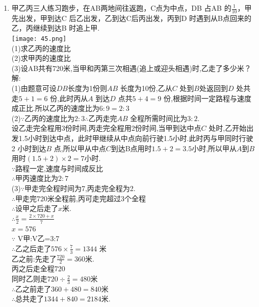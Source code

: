 \documentclass[12pt,oneside,a4paper]{ctexbook} %
\numberwithin{chapter}{part}
\begin{document}
\begin{enumerate}
\item 
甲乙丙三人练习跑步，在AB两地间往返跑，C点为中点，DB 占AB 的$\frac{1}{10}$，甲先出发，甲到达C 后乙出发，乙到达C后丙出发，丙到D 时遇到从B点回来的乙，丙继续到达B 时追上甲.\\
\texttt{[image: 45.png]}\\
(1)求乙丙的速度比\\
(2)求甲丙的速度比\\
(3)设AB共有720米,当甲和丙第三次相遇(追上或迎头相遇)时,乙走了多少米？\\
解:\\
(1)由题意可设$DB$长度为1份则$AB$ 长度为10份,乙从$C$ 处到$B$处返回到$D$ 处共走$5+1=6$ 份,此时丙从$A$ 到达$D$ 点共$5+4=9$ 份,根据时间一定路程与速度成正比.所以乙丙的速度比为$6:9=2:3$\\
(2)$\because$乙丙的速度比为$2:3$$\therefore$乙丙走完$AB$ 全程所需时间比为$3:2$.\\
设乙走完全程用3份时间,丙走完全程用2份时间,当甲到达中点$C$ 处时,乙开始出发1.5小时到达中点，此时甲继续从中点向前行驶1.5小时.此时丙与甲同时行驶2 小时到达$B$ 点,所以甲从中点$C$到达B点用时$1.5+2=3.5$小时,所以甲从$A$到$B$ 用时$(1.5+2)\times2=7$小时.\\
$\because$路程一定,速度与时间成反比\\
$\therefore$甲丙速度比为$2:7$\\
(3)$\because$甲走完全程时间为7,丙走完全程为2.\\
$\therefore$甲走完720米全程前,丙可走完超过3个全程\\
$\therefore$设甲之后走了$x$米.\\
$\therefore \frac{x}{2}=\frac{2\times720+x}{7}$\\
$x=576$\\
$\because$
V甲:V乙=3:7\\
$\therefore$乙之后走了$576\times\frac{7}{3}=1344$ 米\\
乙之前:先走了$\frac{720}{2}=360$米.\\
丙之后走全程720\\
同时乙则走$720\div\frac{2}{3}=480$米\\
$\therefore$乙之前走了$360+480=840$米\\
$\therefore$总共走了$1344+840=2184$米.


\end{enumerate}
\end{document}
